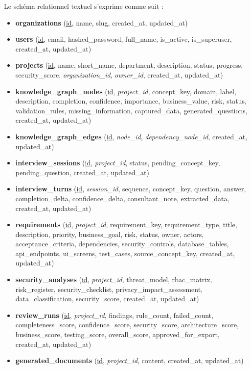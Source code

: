 Le schéma relationnel textuel s'exprime comme suit :
\begin{flushleft}
\small
\begin{itemize}
    \item \textbf{organizations} (\underline{id}, name, slug, created\_at, updated\_at)
    \item \textbf{users} (\underline{id}, email, hashed\_password, full\_name, is\_active, is\_superuser, created\_at, updated\_at)
    \item \textbf{projects} (\underline{id}, name, short\_name, department, description, status, progress, security\_score, \textit{organization\_id}, \textit{owner\_id}, created\_at, updated\_at)
    \item \textbf{knowledge\_graph\_nodes} (\underline{id}, \textit{project\_id}, concept\_key, domain, label, description, completion, confidence, importance, business\_value, risk, status, validation\_rules, missing\_information, captured\_data, generated\_questions, created\_at, updated\_at)
    \item \textbf{knowledge\_graph\_edges} (\underline{id}, \textit{node\_id}, \textit{dependency\_node\_id}, created\_at, updated\_at)
    \item \textbf{interview\_sessions} (\underline{id}, \textit{project\_id}, status, pending\_concept\_key, pending\_question, created\_at, updated\_at)
    \item \textbf{interview\_turns} (\underline{id}, \textit{session\_id}, sequence, concept\_key, question, answer, completion\_delta, confidence\_delta, consultant\_note, extracted\_data, created\_at, updated\_at)
    \item \textbf{requirements} (\underline{id}, \textit{project\_id}, requirement\_key, requirement\_type, title, description, priority, business\_goal, risk, status, owner, actors, acceptance\_criteria, dependencies, security\_controls, database\_tables, api\_endpoints, ui\_screens, test\_cases, source\_concept\_key, created\_at, updated\_at)
    \item \textbf{security\_analyses} (\underline{id}, \textit{project\_id}, threat\_model, rbac\_matrix, risk\_register, security\_checklist, privacy\_impact\_assessment, data\_classification, security\_score, created\_at, updated\_at)
    \item \textbf{review\_runs} (\underline{id}, \textit{project\_id}, findings, rule\_count, failed\_count, completeness\_score, confidence\_score, security\_score, architecture\_score, business\_score, testing\_score, overall\_score, approved\_for\_export, created\_at, updated\_at)
    \item \textbf{generated\_documents} (\underline{id}, \textit{project\_id}, content, created\_at, updated\_at)
\end{itemize}
\end{flushleft}

